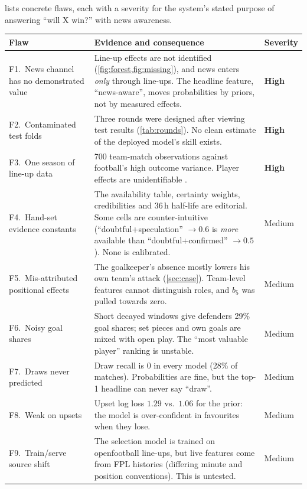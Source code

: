 \documentclass[11pt,a4paper]{article}
\newcommand{\sev}[1]{\textbf{\textcolor{warn}{#1}}}
\begin{document}
 lists concrete flaws, each with a severity for the system's
stated purpose of answering ``will X win?'' with news awareness.

\begin{table}[p]
\centering\small
\renewcommand{\arraystretch}{1.15}
\begin{tabularx}{\linewidth}{@{}>{\raggedright\arraybackslash}p{3.6cm}X>{\centering\arraybackslash}p{1.4cm}@{}}
\toprule
Flaw & Evidence and consequence & Severity\\
\midrule
F1.~News channel has no demonstrated value & Line-up effects are not identified (\cref{fig:forest,fig:missing}), and news enters \emph{only} through line-ups. The headline feature, ``news-aware'', moves probabilities by priors, not by measured effects. & \sev{High}\\
F2.~Contaminated test folds & Three rounds were designed after viewing test results (\cref{tab:rounds}). No clean estimate of the deployed model's skill exists. & \sev{High}\\
F3.~One season of line-up data & 700 team-match observations against football's high outcome variance. Player effects are unidentifiable \citep{kharrat2020}. & \sev{High}\\
F4.~Hand-set evidence constants & The availability table, certainty weights, credibilities and 36\,h half-life are editorial. Some cells are counter-intuitive (``doubtful+speculation'' $\to0.6$ is \emph{more} available than ``doubtful+confirmed'' $\to0.5$). None is calibrated. & Medium\\
F5.~Mis-attributed positional effects & The goalkeeper's absence mostly lowers his own team's attack (\cref{sec:case}). Team-level features cannot distinguish roles, and $b_5$ was pulled towards zero. & Medium\\
F6.~Noisy goal shares & Short decayed windows give defenders 29\% goal shares; set pieces and own goals are mixed with open play. The ``most valuable player'' ranking is unstable. & Medium\\
F7.~Draws never predicted & Draw recall is 0 in every model (28\% of matches). Probabilities are fine, but the top-1 headline can never say ``draw''. & Medium\\
F8.~Weak on upsets & Upset log loss $1.29$ vs.\ $1.06$ for the prior: the model is over-confident in favourites when they lose. & Medium\\
F9.~Train/serve source shift & The selection model is trained on openfootball line-ups, but live features come from FPL histories (differing minute and position conventions). This is untested. & Medium\\

\end{tabularx}
\end{table}
\end{document}
